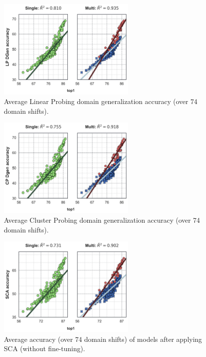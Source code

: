 \documentclass{article}
\begin{document}
\begin{figure}[h!]
\begin{center}
\includegraphics[width=0.6\textwidth]{images_lines/multilinear_LP_DGen.png}
\end{center}
\caption{Average Linear Probing domain generalization accuracy (over 74 domain shifts).}
\end{figure}

\begin{figure}[h!]
\begin{center}
\includegraphics[width=0.6\textwidth]{images_lines/multilinear_CP_DGen.png}
\end{center}
\caption{Average Cluster Probing domain generalization accuracy (over 74 domain shifts).}
\end{figure}


\begin{figure}[h!]
\begin{center}
\includegraphics[width=0.6\textwidth]{images_lines/multilinear_SCA.png}
\end{center}
\caption{Average accuracy (over 74 domain shifts) of models after applying SCA (without fine-tuning).}
\end{figure}
\end{document}
